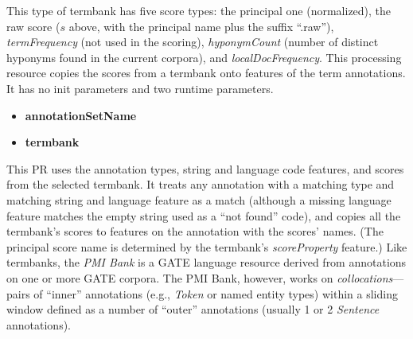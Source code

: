 This type of termbank has five score types: the principal one (normalized), the
raw score ($s$ above, with the principal name plus the suffix ``.raw''),
\emph{termFrequency} (not used in the scoring), \emph{hyponymCount} (number of
distinct hyponyms found in the current corpora), and \emph{localDocFrequency}.
This processing resource copies the scores from a termbank onto features of the
term annotations.  It has no init parameters and two runtime parameters.
\begin{itemize}
\item \textbf{annotationSetName}
\item \textbf{termbank}
\end{itemize}
This PR uses the annotation types, string and language code features, and scores
from the selected termbank.  It treats any annotation with a matching type and
matching string and language feature as a match (although a missing language
feature matches the empty string used as a ``not found'' code), and copies all
the termbank's scores to features on the annotation with the scores' names.
(The principal score name is determined by the termbank's \emph{scoreProperty}
feature.)
Like termbanks, the \emph{PMI Bank} is a GATE language resource derived from
annotations on one or more GATE corpora.  The PMI Bank, however, works on
\emph{collocations}---pairs of ``inner'' annotations (e.g., \emph{Token} or
named entity types) within a sliding window defined as a number of ``outer''
annotations (usually 1 or 2 \emph{Sentence} annotations).

